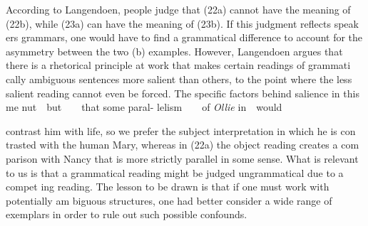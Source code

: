 \begin{styleStandard}
According to Langendoen, people judge that (22a) cannot have the meaning of (22b), while (23a) can have the meaning of (23b). If this judgment reflects speak ers{\textquotesingle} grammars, one would have to find a grammatical difference to account for the asymmetry between the two (b) examples. However, Langendoen argues that there is a rhetorical principle at work that makes certain readings of grammati\- cally ambiguous sentences more salient than others, to the point where the less salient reading cannot even be forced. The specific factors behind salience in this me nut\ \ but\ \ \ \ that some paral- lelism\ \ \ \ of \textit{Ollie}\textit{ }in\ \ would
\end{styleStandard}


\begin{styleStandard}
contrast him with life, so we prefer the subject interpretation in which he is con\- trasted with the human Mary, whereas in (22a) the object reading creates a com\- parison with Nancy that is more strictly parallel in some sense. What is relevant to us is that a grammatical reading might be judged ungrammatical due to a compet\- ing reading. The lesson to be drawn is that if one must work with potentially am\- biguous structures, one had better consider a wide range of exemplars in order to rule out such possible confounds.
\end{styleStandard}


